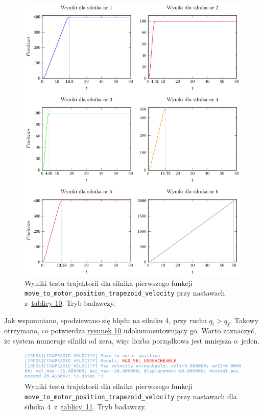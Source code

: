 \documentclass[a4paper, 12pt]{article}
\begin{document}
	\begin{figure}[H]
		\centering
		\includegraphics[scale=1.1]{raport_graphs/simpMPVRall.pdf}
		\caption{Wyniki testu trajektorii dla silnika pierwszego funkcji \texttt{move\_to\_motor\_position\_trapezoid\_velocity} przy nastawach z~\hyperref[tab:setup3]{tablicy 10}. Tryb badawczy.}
		\label{fig:simpMPVRall}
	\end{figure}
	
	Jak wspomniano, spodziewano się błędu na silniku 4, przy ruchu $ q_i>q_f$. Takowy otrzymano, co potwierdza \hyperref[fig:res_fail_msg]{rysunek 10} udokumoentowujący go. Warto zaznaczyć, że system numeruje silniki od zera, więc liczba porządkowa jest mniejsza o~jeden.
	
	\begin{figure}[H]
	 	\centering
	 	\includegraphics[scale=0.635]{raport_pics/res_fail_msg.png}
	 	\caption{Wyniki testu trajektorii dla silnika pierwszego funkcji \texttt{move\_to\_motor\_position\_trapezoid\_velocity} przy nastawach dla silnika 4~z~\hyperref[tab:setup4]{tablicy~11}. Tryb badawczy.}
		\label{fig:res_fail_msg}
	\end{figure}
	
\end{document}
